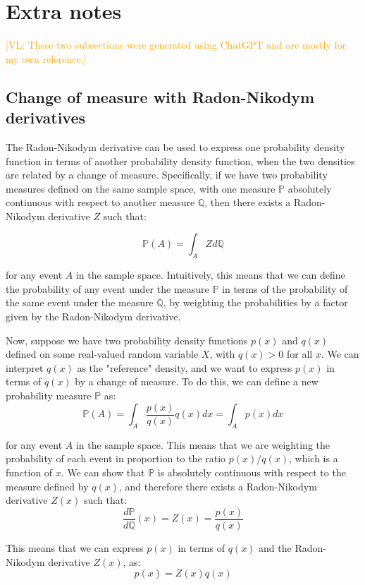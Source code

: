 \documentclass{article}
\newcommand{\vl}[1]{\textcolor{orange}{[VL: #1]}}
\begin{document}
\newpage
\appendix

\section{Extra notes}

\vl{These two subsections were generated using ChatGPT and are mostly for my own reference.}

\subsection{Change of measure with Radon-Nikodym derivatives}
\label{sec:change_of_measure}

The Radon-Nikodym derivative can be used to express one probability density function in terms of another probability density function, when the two densities are related by a change of measure. Specifically, if we have two probability measures defined on the same sample space, with one measure $\mathbb{P}$ absolutely continuous with respect to another measure $\mathbb{Q}$, then there exists a Radon-Nikodym derivative $Z$ such that:

$$\mathbb{P}(A) = \int_A Z d\mathbb{Q}$$

for any event $A$ in the sample space. Intuitively, this means that we can define the probability of any event under the measure $\mathbb{P}$ in terms of the probability of the same event under the measure $\mathbb{Q}$, by weighting the probabilities by a factor given by the Radon-Nikodym derivative.

Now, suppose we have two probability density functions $p(x)$ and $q(x)$ defined on some real-valued random variable $X$, with $q(x)>0$ for all $x$. We can interpret $q(x)$ as the "reference" density, and we want to express $p(x)$ in terms of $q(x)$ by a change of measure. To do this, we can define a new probability measure $\mathbb{P}$ as:
$$\mathbb{P}(A) = \int_A \frac{p(x)}{q(x)} q(x) dx = \int_A p(x) dx$$

for any event $A$ in the sample space. This means that we are weighting the probability of each event in proportion to the ratio $p(x)/q(x)$, which is a function of $x$. We can show that $\mathbb{P}$ is absolutely continuous with respect to the measure defined by $q(x)$, and therefore there exists a Radon-Nikodym derivative $Z(x)$ such that:
$$\frac{d\mathbb{P}}{d\mathbb{Q}}(x) = Z(x) = \frac{p(x)}{q(x)}$$

This means that we can express $p(x)$ in terms of $q(x)$ and the Radon-Nikodym derivative $Z(x)$, as:
$$p(x) = Z(x) q(x)$$
\end{document}
